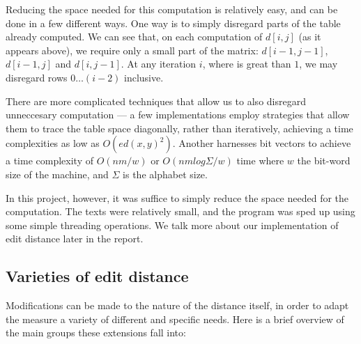 Reducing the space needed for this computation is relatively easy, and
can be done in a few different ways. One way is to simply disregard
parts of the table already computed. We can see that, on each
computation of $d[i,j]$ (as it appears above), we require only a small
part of the matrix: $d[i-1,j-1]$, $d[i-1,j]$ and $d[i,j-1]$. At any
iteration $i$, where is great than $1$, we may disregard rows $0 \dots
(i-2)$ inclusive.

There are more complicated techniques that allow us to also disregard
unneccesary computation --- a few implementations employ strategies
that allow them to trace the table space diagonally, rather than
iteratively, achieving a time complexities as low as $O(ed(x,
y)^2)$.\cite{Chang1992} Another harnesses bit vectors to achieve a
time complexity of $O(nm/w)$ or $O(nm log {\Sigma}/w)$ time where $w$
the bit-word size of the machine, and $\Sigma$ is the alphabet
size.\cite{Myers1999}\cite{Hyyro2003} 

In this project, however, it was suffice to simply reduce the space
needed for the computation. The texts were relatively small, and the
program was sped up using some simple threading operations. We talk
more about our implementation of edit distance later in the report. 

\subsection*{Varieties of edit distance}
Modifications can be made to the nature of the distance itself, in
order to adapt the measure a variety of different and specific
needs. Here is a brief overview of the main groups these extensions
fall into:

